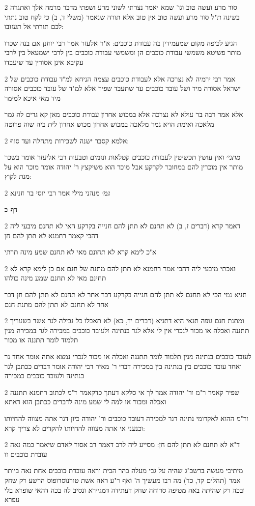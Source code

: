 \documentclass[12pt, openany]{book}
\newcommand{\sethebfont}{
\fontsize{10.5pt}{21.0pt} \selectfont
}
\newcommand{\twocol}[1]{
	{\sethebfont \begin{multicols}{2}
			#1
	\end{multicols}}	
}
\newcommand{\sectname}{}
\newcommand{\newsection}[1]{
	\addcontentsline{toc}{section}{#1}
	\renewcommand{\sectname}{#1}	
	\vspace{-\baselineskip}
	\begin{center}
		\textbf{%
\fontsize{16pt}{16pt}\selectfont
			#1}
	\end{center}
	\vspace{-\baselineskip}
	\nopagebreak
}
\begin{document}
\twocol{סור מרע ועשה טוב וגו' שמא יאמר נצרתי לשוני מרע ושפתי מדבר מרמה אלך ואתגרה בשינה ת"ל סור מרע ועשה טוב אין טוב אלא תורה שנאמר (משלי ד, ב) כי לקח טוב נתתי לכם תורתי אל תעזובו:
\par הגיע לכיפה מקום שמעמידין בה עבודת כוכבים: א"ר אלעזר אמר רבי יוחנן אם בנה שכרו מותר פשיטא משמשי עבודת כוכבים הן ומשמשי עבודת כוכבים בין לרבי ישמעאל בין לרבי עקיבא אינן אסורין עד שיעבדו}
\twocol{אמר רבי ירמיה לא נצרכה אלא לעבודת כוכבים עצמה הניחא למ"ד עבודת כוכבים של ישראל אסורה מיד ושל עובד כוכבים עד שתעבד שפיר אלא למ"ד של עובד כוכבים אסורה מיד מאי איכא למימר
\par אלא אמר רבה בר עולא לא נצרכה אלא במכוש אחרון עבודת כוכבים מאן קא גרים לה גמר מלאכה ואימת הויא גמר מלאכה במכוש אחרון מכוש אחרון לית ביה שוה פרוטה}
\twocol{אלמא קסבר ישנה לשכירות מתחלה ועד סוף:
\par {\large\emph{מתני׳}} ואין עושין תכשיטין לעבודת כוכבים קטלאות ונזמים וטבעות רבי אליעזר אומר בשכר מותר אין מוכרין להם במחובר לקרקע אבל מוכר הוא משיקצץ ר' יהודה אומר מוכר הוא על מנת לקוץ:}
\twocol{{\large\emph{גמ׳}} מנהני מילי אמר רבי יוסי בר חנינא}
\newsection{דף כ}
\twocol{דאמר קרא (דברים ז, ב) לא תחנם לא תתן להם חנייה בקרקע האי לא תחנם מיבעי ליה דהכי קאמר רחמנא לא תתן להם חן
\par א"כ לימא קרא לא תחונם מאי לא תחנם שמע מינה תרתי}
\twocol{ואכתי מיבעי ליה דהכי אמר רחמנא לא תתן להם מתנת של חנם אם כן לימא קרא לא תחינם מאי לא תחנם שמע מינה כולהו
\par תניא נמי הכי לא תחנם לא תתן להם חנייה בקרקע דבר אחר לא תחנם לא תתן להם חן דבר אחר לא תחנם לא תתן להם מתנת חנם}
\twocol{ומתנת חנם גופה תנאי היא דתניא (דברים יד, כא) לא תאכלו כל נבילה לגר אשר בשעריך תתננה ואכלה או מכור לנכרי אין לי אלא לגר בנתינה ולעובד כוכבים במכירה לגר במכירה מנין תלמוד לומר תתננה או מכור
\par לעובד כוכבים בנתינה מנין תלמוד לומר תתננה ואכלה או מכור לנכרי נמצא אתה אומר אחד גר ואחד עובד כוכבים בין בנתינה בין במכירה דברי ר' מאיר רבי יהודה אומר דברים ככתבן לגר בנתינה ולעובד כוכבים במכירה}
\twocol{שפיר קאמר ר"מ ור' יהודה אמר לך אי סלקא דעתך כדקאמר ר"מ לכתוב רחמנא תתננה ואכלה ומכור או למה לי שמע מינה לדברים ככתבן הוא דאתא
\par ור"מ ההוא לאקדומי נתינה דגר למכירה דעובד כוכבים ור' יהודה כיון דגר אתה מצווה להחיותו וכנעני אי אתה מצווה להחיותו להקדים לא צריך קרא:}
\twocol{ד"א לא תחנם לא תתן להם חן: מסייע ליה לרב דאמר רב אסור לאדם שיאמר כמה נאה עובדת כוכבים זו
\par מיתיבי מעשה ברשב"ג שהיה על גבי מעלה בהר הבית וראה עובדת כוכבים אחת נאה ביותר אמר (תהלים קד, כד) מה רבו מעשיך ה' ואף ר"ע ראה אשת טורנוסרופוס הרשע רק שחק ובכה רק שהיתה באה מטיפה סרוחה שחק דעתידה דמגיירא ונסיב לה בכה דהאי שופרא בלי עפרא}
\end{document}
